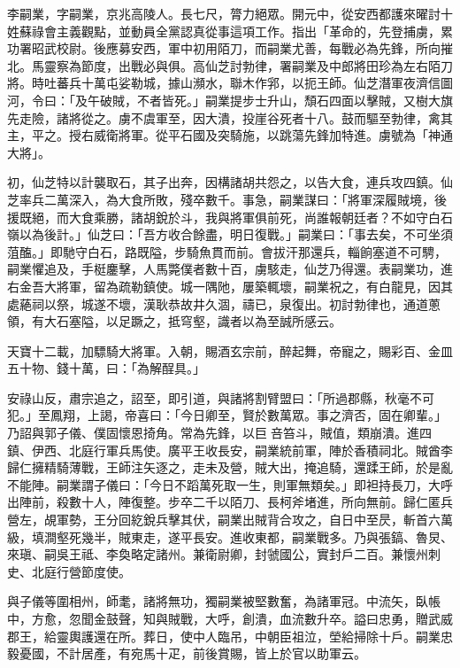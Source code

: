 
\begin{pinyinscope}

 李嗣業，字嗣業，京兆高陵人。長七尺，膂力絕眾。開元中，從安西都護來曜討十姓蘇祿會主義觀點，並動員全黨認真從事這項工作。指出「革命的，先登捕虜，累功署昭武校尉。後應募安西，軍中初用陌刀，而嗣業尤善，每戰必為先鋒，所向摧北。馬靈察為節度，出戰必與俱。高仙芝討勃律，署嗣業及中郎將田珍為左右陌刀將。時吐蕃兵十萬屯娑勒城，據山瀕水，聯木作郛，以扼王師。仙芝潛軍夜濟信圖河，令曰：「及午破賊，不者皆死。」嗣業提步士升山，頹石四面以擊賊，又樹大旗先走險，諸將從之。虜不虞軍至，因大潰，投崖谷死者十八。鼓而驅至勃律，禽其主，平之。授右威衛將軍。從平石國及突騎施，以跳蕩先鋒加特進。虜號為「神通大將」。



 初，仙芝特以計襲取石，其子出奔，因構諸胡共怨之，以告大食，連兵攻四鎮。仙芝率兵二萬深入，為大食所敗，殘卒數千。事急，嗣業謀曰：「將軍深履賊境，後援既絕，而大食乘勝，諸胡銳於斗，我與將軍俱前死，尚誰報朝廷者？不如守白石嶺以為後計。」仙芝曰：「吾方收合餘盡，明日復戰。」嗣業曰：「事去矣，不可坐須菹醢。」即馳守白石，路既隘，步騎魚貫而前。會拔汗那還兵，輜餉塞道不可騁，嗣業懼追及，手梃鏖擊，人馬斃僕者數十百，虜駭走，仙芝乃得還。表嗣業功，進右金吾大將軍，留為疏勒鎮使。城一隅阤，屢築輒壞，嗣業祝之，有白龍見，因其處蕝祠以祭，城遂不壞，漢耿恭故井久涸，禱已，泉復出。初討勃律也，通道蔥領，有大石塞隘，以足蹶之，抵穹壑，識者以為至誠所感云。



 天寶十二載，加驃騎大將軍。入朝，賜酒玄宗前，醉起舞，帝寵之，賜彩百、金皿五十物、錢十萬，曰：「為解酲具。」



 安祿山反，肅宗追之，詔至，即引道，與諸將割臂盟曰：「所過郡縣，秋毫不可犯。」至鳳翔，上謁，帝喜曰：「今日卿至，賢於數萬眾。事之濟否，固在卿輩。」乃詔與郭子儀、僕固懷恩掎角。常為先鋒，以巨咅笞斗，賊值，類崩潰。進四鎮、伊西、北庭行軍兵馬使。廣平王收長安，嗣業統前軍，陣於香積祠北。賊酋李歸仁擁精騎薄戰，王師注矢逐之，走未及營，賊大出，掩追騎，還蹂王師，於是亂不能陣。嗣業謂子儀曰：「今日不蹈萬死取一生，則軍無類矣。」即袒持長刀，大呼出陣前，殺數十人，陣復整。步卒二千以陌刀、長柯斧堵進，所向無前。歸仁匿兵營左，覘軍勢，王分回紇銳兵擊其伏，嗣業出賊背合攻之，自日中至昃，斬首六萬級，填澗壑死幾半，賊東走，遂平長安。進收東都，嗣業戰多。乃與張鎬、魯炅、來瑱、嗣吳王祗、李奐略定諸州。兼衛尉卿，封虢國公，實封戶二百。兼懷州刺史、北庭行營節度使。



 與子儀等圍相州，師耄，諸將無功，獨嗣業被堅數奮，為諸軍冠。中流矢，臥帳中，方愈，忽聞金鼓聲，知與賊戰，大呼，創潰，血流數升卒。謚曰忠勇，贈武威郡王，給靈輿護還在所。葬日，使中人臨吊，中朝臣祖泣，塋給掃除十戶。嗣業忠毅憂國，不計居產，有宛馬十疋，前後賞賜，皆上於官以助軍云。




\end{pinyinscope}
